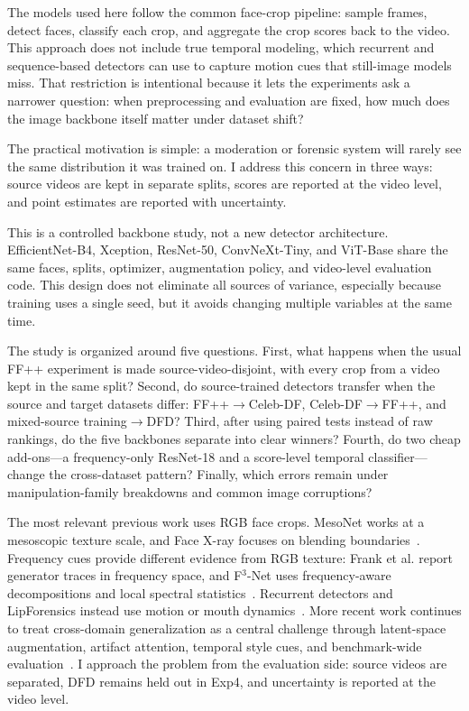 \documentclass[pdflatex,sn-mathphys-num,iicol]{sn-jnl}
\begin{document}
The models used here follow the common face-crop pipeline: sample frames, detect faces, classify each crop, and aggregate the crop scores back to the video. This approach does not include true temporal modeling, which recurrent and sequence-based detectors can use to capture motion cues that still-image models miss. That restriction is intentional because it lets the experiments ask a narrower question: when preprocessing and evaluation are fixed, how much does the image backbone itself matter under dataset shift?

The practical motivation is simple: a moderation or forensic system will rarely see the same distribution it was trained on. I address this concern in three ways: source videos are kept in separate splits, scores are reported at the video level, and point estimates are reported with uncertainty.

This is a controlled backbone study, not a new detector architecture. EfficientNet-B4, Xception, ResNet-50, ConvNeXt-Tiny, and ViT-Base share the same faces, splits, optimizer, augmentation policy, and video-level evaluation code. This design does not eliminate all sources of variance, especially because training uses a single seed, but it avoids changing multiple variables at the same time.

The study is organized around five questions. First, what happens when the usual FF++ experiment is made source-video-disjoint, with every crop from a video kept in the same split? Second, do source-trained detectors transfer when the source and target datasets differ: FF++$\to$Celeb-DF, Celeb-DF$\to$FF++, and mixed-source training$\to$DFD? Third, after using paired tests instead of raw rankings, do the five backbones separate into clear winners? Fourth, do two cheap add-ons---a frequency-only ResNet-18 and a score-level temporal classifier---change the cross-dataset pattern? Finally, which errors remain under manipulation-family breakdowns and common image corruptions?

The most relevant previous work uses RGB face crops. MesoNet works at a mesoscopic texture scale, and Face X-ray focuses on blending boundaries~\cite{ref:mesonet,ref:facexray}. Frequency cues provide different evidence from RGB texture: Frank et al. report generator traces in frequency space, and F$^3$-Net uses frequency-aware decompositions and local spectral statistics~\cite{ref:frank,ref:f3net}. Recurrent detectors and LipForensics instead use motion or mouth dynamics~\cite{ref2,ref:lipforensics}. More recent work continues to treat cross-domain generalization as a central challenge through latent-space augmentation, artifact attention, temporal style cues, and benchmark-wide evaluation~\cite{ref:lsda,ref:laanet,ref:styleflows,ref:gend}. I approach the problem from the evaluation side: source videos are separated, DFD remains held out in Exp4, and uncertainty is reported at the video level.
\end{document}
